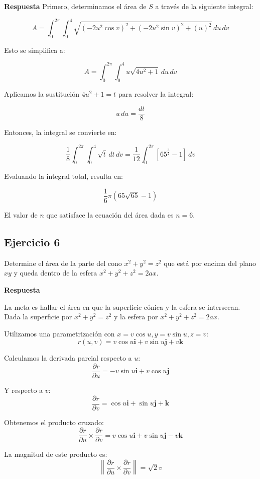\documentclass{report}
\begin{document}
\textbf{Respuesta}
Primero, determinamos el área de $S$ a través de la siguiente integral:

\[
A = \int_0^{2 \pi} \int_0^4 \sqrt{\left( -2 u^2 \cos v \right)^2 + \left( -2 u^2 \sin v \right)^2 + (u)^2} \, du \, dv
\]

Esto se simplifica a:

\[
A = \int_0^{2 \pi} \int_0^4 u \sqrt{4 u^2 + 1} \, du \, dv
\]

Aplicamos la sustitución \( 4 u^2 + 1 = t \) para resolver la integral:

\[
u \, du = \frac{dt}{8}
\]

Entonces, la integral se convierte en:

\[
\frac{1}{8} \int_0^{2 \pi} \int_0^4 \sqrt{t} \, dt \, dv = \frac{1}{12} \int_0^{2 \pi} [65^\frac{3}{2} - 1] \, dv
\]

Evaluando la integral total, resulta en:

\[
\frac{1}{6} \pi (65 \sqrt{65} - 1)
\]

El valor de $n$ que satisface la ecuación del área dada es $n = 6$.

\subsection*{Ejercicio 6}
Determine el área de la parte del cono \( x^2 + y^2 = z^2 \) que está por encima del plano \( xy \) y queda dentro de la esfera \( x^2 + y^2 + z^2 = 2ax \).

\textbf{Respuesta}

La meta es hallar el área en que la superficie cónica y la esfera se intersecan. Dada la superficie por \( x^2 + y^2 = z^2 \) y la esfera por \( x^2 + y^2 + z^2 = 2ax \).

Utilizamos una parametrización con \( x = v \cos u, y = v \sin u, z = v \):
\[
r(u, v) = v \cos u \mathbf{i} + v \sin u \mathbf{j} + v \mathbf{k}
\]

Calculamos la derivada parcial respecto a \( u \):
\[
\frac{\partial r}{\partial u} = -v \sin u \mathbf{i} + v \cos u \mathbf{j}
\]

Y respecto a \( v \):
\[
\frac{\partial r}{\partial v} = \cos u \mathbf{i} + \sin u \mathbf{j} + \mathbf{k}
\]

Obtenemos el producto cruzado:
\[
\frac{\partial r}{\partial u} \times \frac{\partial r}{\partial v} = v \cos u \mathbf{i} + v \sin u \mathbf{j} - v \mathbf{k}
\]

La magnitud de este producto es:
\[
\left\| \frac{\partial r}{\partial u} \times \frac{\partial r}{\partial v} \right\| = \sqrt{2} v
\]
\end{document}
